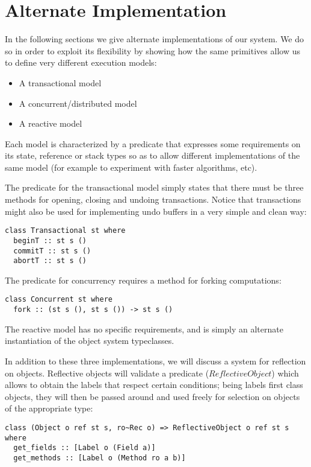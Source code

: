 \section{Alternate Implementation}
In the following sections we give alternate implementations of our system. We do so in order to exploit its flexibility by showing how the same primitives allow us to define very different execution models:
\begin{itemize}
\item A transactional model
\item A concurrent/distributed model
\item A reactive model
\end{itemize}

Each model is characterized by a predicate that expresses some requirements on its state, reference or stack types so as to allow different implementations of the same model (for example to experiment with faster algorithms, etc).

The predicate for the transactional model simply states that there must be three methods for opening, closing and undoing transactions. Notice that transactions might also be used for implementing undo buffers in a very simple and clean way:
\begin{lstlisting}
class Transactional st where
  beginT :: st s ()
  commitT :: st s ()
  abortT :: st s ()
\end{lstlisting}

The predicate for concurrency requires a method for forking computations:
\begin{lstlisting}
class Concurrent st where
  fork :: (st s (), st s ()) -> st s ()
\end{lstlisting}

The reactive model has no specific requirements, and is simply an alternate instantiation of the object system typeclasses.

In addition to these three implementations, we will discuss a system for reflection on objects. Reflective objects will validate a predicate ($ReflectiveObject$) which allows to obtain the labels that respect certain conditions; being labels first class objects, they will then be passed around and used freely for selection on objects of the appropriate type:
\begin{lstlisting}
class (Object o ref st s, ro~Rec o) => ReflectiveObject o ref st s where
  get_fields :: [Label o (Field a)]
  get_methods :: [Label o (Method ro a b)]
\end{lstlisting}
